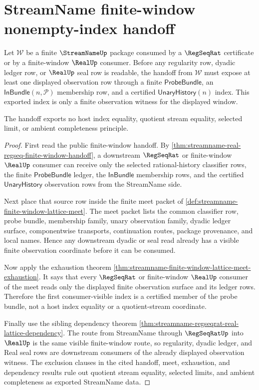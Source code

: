 \section{StreamName finite-window nonempty-index handoff}
\label{sec:streamname-window-index-nonempty-handoff}

\begin{theorem}
\label{thm:streamname-window-index-nonempty-handoff}
Let $\mathcal W$ be a finite $\StreamNameUp$ package consumed by a
$\RegSeqRat$ certificate or by a finite-window $\RealUp$ consumer. Before any
regularity row, dyadic ledger row, or $\RealUp$ seal row is readable, the
handoff from $\mathcal W$ must expose at least one displayed observation row
through a finite $\mathsf{ProbeBundle}$, an
$\mathsf{InBundle}(n,\mathcal P)$ membership row, and a certified
$\mathsf{UnaryHistory}(n)$ index. This exported index is only a finite
observation witness for the displayed window.

The handoff exports no host index equality, quotient stream equality,
selected limit, or ambient completeness principle.
\end{theorem}
\begin{proof}
First read the public finite-window handoff. By
\autoref{thm:streamname-real-regseq-finite-window-handoff}, a downstream
$\RegSeqRat$ or finite-window $\RealUp$ consumer can receive only the selected
rational-history classifier rows, the finite $\mathsf{ProbeBundle}$ ledger,
the $\mathsf{InBundle}$ membership rows, and the certified
$\mathsf{UnaryHistory}$ observation rows from the StreamName side.

Next place that source row inside the finite meet packet of
\autoref{def:streamname-finite-window-lattice-meet}. The meet packet lists the
common classifier row, probe bundle, membership family, unary observation
family, dyadic ledger surface, componentwise transports, continuation routes,
package provenance, and local names. Hence any downstream dyadic or seal read
already has a visible finite observation coordinate before it can be consumed.

Now apply the exhaustion theorem
\autoref{thm:streamname-finite-window-lattice-meet-exhaustion}. It says that
every $\RegSeqRat$ or finite-window $\RealUp$ consumer of the meet reads only
the displayed finite observation surface and its ledger rows. Therefore the
first consumer-visible index is a certified member of the probe bundle, not a
host index equality or a quotient-stream coordinate.

Finally use the sibling dependency theorem
\autoref{thm:streamname-regseqrat-real-lattice-dependency}. The route from
StreamName through $\RegSeqRatUp$ into $\RealUp$ is the same visible
finite-window route, so regularity, dyadic ledger, and Real seal rows are
downstream consumers of the already displayed observation witness. The
exclusion clauses in the cited handoff, meet, exhaustion, and dependency
results rule out quotient stream equality, selected limits, and ambient
completeness as exported StreamName data.
\end{proof}

